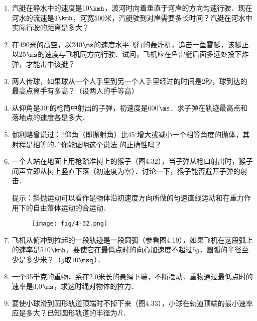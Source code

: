 \begin{enumerate}
	\item 汽艇在静水中的速度是10$\kmh$，渡河时向着垂直于河岸的方向匀速行驶．现在河水的流速是3$\kmh$，河宽500米，汽艇驶到对岸需要多长时间？汽艇在河水中实际行驶的距离是多大？
\item 在490米的高空，以240$\ms$的速度水平飞行的轰炸机，追击一鱼雷艇，该艇正以25$\ms$的速度与飞机同方向行驶．试问，飞机应在鱼雷艇后面多远处投下炸弹，才能击中该艇？
\item 两人传球，如果球从一个人手里到另一个人手里经过的时间是2秒，球到达的最高点离手有多高？（设两人的手等高）
\item 从仰角是30$^\circ$的枪筒中射出的子弹，初速度是600$\ms$．求子弹在轨迹最高点和落地点的速度各是多大．
\item 伽利略曾说过：“仰角（即抛射角）比45$^\circ$增大或减小一个相等角度的抛体，其射程是相等的．”你能证明这个说法
的正确性吗？
\item 一个人站在地面上用枪踏准树上的猴子（图4.32），当子弹从枪口射出时，猴子闻声立即从树上竖直下落（初速度为零）．讨论一下，猴子能否避开子弹的射击．

提示：斜抛运动可以看作是物体沿初速度方向所做的匀速直线运动和在重力作用下的自由落体运动的合运动．

\begin{figure}[htp]
\centering\texttt{[image: fig/4-32.png]}
\caption{}
\end{figure}

\item  飞机从俯冲到拉起的一段轨迹是一段圆弧（参看图4.19），如果飞机在这段弧上的速率是540$\kmh$，要使它在最低点时的向心加速度不超过$5g$，圆弧的半径至少是多少米？（$g$取$10\msq$）．
\item  一个35千克的重物，系在2.0米长的悬绳下端，不断摆动．重物通过最低点时的速率是3.0$\ms$，求这时绳对物体的拉力．
\item  要使小球滑到圆形轨道顶端时不掉下来（图4.33），小球在轨道顶端的最小速率应是多大？已知圆形轨道的半径为$R$．
\begin{figure}[htp]
\centering
{}
\end{figure}
\end{enumerate}
